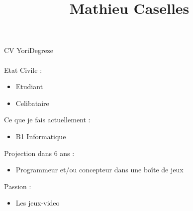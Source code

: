 \documentclass[12pt,oneside,a4paper]{article}
\begin{document}
\title{Mathieu Caselles}
CV YoriDegreze

\paragraph{}

Etat Civile :
\begin{itemize}
\item Etudiant
\item Celibataire
\end{itemize}

Ce que je fais actuellement :
\begin{itemize}
\item  B1 Informatique
\end{itemize}

Projection dans 6 ans  :
\begin{itemize}
\item Programmeur et/ou concepteur dans une boîte de jeux 
\end{itemize}

Passion :
\begin{itemize}
\item Les jeux-video
\end{itemize}
\end{document}
